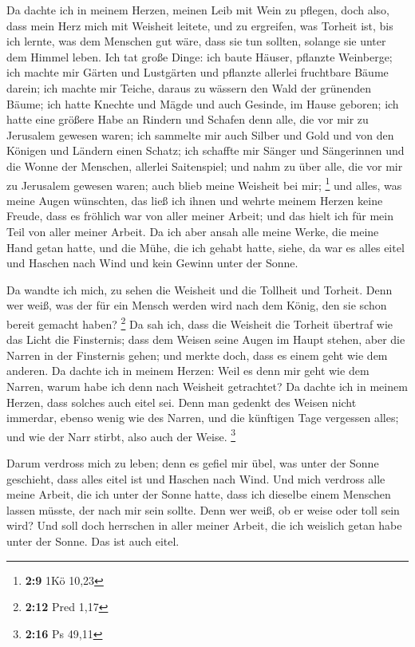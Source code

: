  Da dachte ich in meinem Herzen, meinen Leib mit Wein zu
pflegen, doch also, dass mein Herz mich mit Weisheit leitete, und zu
ergreifen, was Torheit ist, bis ich lernte, was dem Menschen gut wäre,
dass sie tun sollten, solange sie unter dem Himmel leben. 
Ich tat große Dinge: ich baute Häuser, pflanzte Weinberge;
 ich machte mir Gärten und Lustgärten und pflanzte
allerlei fruchtbare Bäume darein;  ich machte mir Teiche,
daraus zu wässern den Wald der grünenden Bäume;  ich hatte
Knechte und Mägde und auch Gesinde, im Hause geboren; ich hatte eine
größere Habe an Rindern und Schafen denn alle, die vor mir zu Jerusalem
gewesen waren;  ich sammelte mir auch Silber und Gold und
von den Königen und Ländern einen Schatz; ich schaffte mir Sänger und
Sängerinnen und die Wonne der Menschen, allerlei Saitenspiel;
 und nahm zu über alle, die vor mir zu Jerusalem gewesen
waren; auch blieb meine Weisheit bei mir; \footnote{\textbf{2:9} 1Kö
  10,23}  und alles, was meine Augen wünschten, das ließ
ich ihnen und wehrte meinem Herzen keine Freude, dass es fröhlich war
von aller meiner Arbeit; und das hielt ich für mein Teil von aller
meiner Arbeit.  Da ich aber ansah alle meine Werke, die
meine Hand getan hatte, und die Mühe, die ich gehabt hatte, siehe, da
war es alles eitel und Haschen nach Wind und kein Gewinn unter der
Sonne.

 Da wandte ich mich, zu sehen die Weisheit und die
Tollheit und Torheit. Denn wer weiß, was der für ein Mensch werden wird
nach dem König, den sie schon bereit gemacht haben? \footnote{\textbf{2:12}
  Pred 1,17}  Da sah ich, dass die Weisheit die Torheit
übertraf wie das Licht die Finsternis;  dass dem Weisen
seine Augen im Haupt stehen, aber die Narren in der Finsternis gehen;
und merkte doch, dass es einem geht wie dem anderen.  Da
dachte ich in meinem Herzen: Weil es denn mir geht wie dem Narren, warum
habe ich denn nach Weisheit getrachtet? Da dachte ich in meinem Herzen,
dass solches auch eitel sei.  Denn man gedenkt des Weisen
nicht immerdar, ebenso wenig wie des Narren, und die künftigen Tage
vergessen alles; und wie der Narr stirbt, also auch der Weise.
\footnote{\textbf{2:16} Ps 49,11}

 Darum verdross mich zu leben; denn es gefiel mir übel,
was unter der Sonne geschieht, dass alles eitel ist und Haschen nach
Wind.  Und mich verdross alle meine Arbeit, die ich unter
der Sonne hatte, dass ich dieselbe einem Menschen lassen müsste, der
nach mir sein sollte.  Denn wer weiß, ob er weise oder
toll sein wird? Und soll doch herrschen in aller meiner Arbeit, die ich
weislich getan habe unter der Sonne. Das ist auch eitel.

